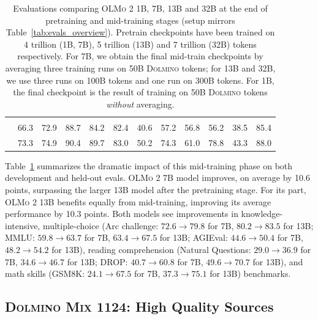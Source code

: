 \documentclass[table]{ai2style/ai2}
\newcommand{\olmotoo}{\textsc{OLMo 2}\xspace}
\newcommand{\dolminos}{\textsc{Dolmino Mix 1124}\xspace}
\begin{document}
\begin{table}[ht]
\begin{center}
\begin{small}
\begin{tabular}{lc|cccccc|cccc}
\rowcolor{ai2midpink}\multicolumn{12}{c}{\textbf{\olmotoo 32B}} \\
\rowcolor{ai2lightpink}{{Pretraining}} & 66.3 & 72.9 & 88.7 & 84.2 & 82.4 & 40.6 & 57.2 & 56.8 & 56.2 & 38.5 & 85.4 \\
\rowcolor{ai2lightpink}{{Pretraining \& mid-training}\hspace{.5em}} & 73.3 & 74.9 & 90.4 & 89.7 & 83.0 & 50.2 & 74.3 & 61.0 & 78.8 & 43.3 & 88.0 \\
\bottomrule
\end{tabular}
\end{small}
\vspace{2mm}
\caption{
Evaluations comparing \olmotoo 1B, 7B, 13B and 32B at the end of pretraining and mid-training stages (setup mirrors Table~\ref{tab:evals_overview}). 
Pretrain checkpoints have been trained on 4 trillion (1B, 7B), 5 trillion (13B) and 7 trillion (32B) tokens respectively. 
For 7B, we obtain the final mid-train checkpoints by averaging three training runs on 50B \textsc{Dolmino} tokens;
for 13B and 32B, we use three runs on 100B tokens and one run on 300B tokens.
For 1B, the final checkpoint is the result of training on 50B \textsc{Dolmino} tokens \textit{without} averaging.}
\label{tab:evals-pre-post-anneal}
\end{center}
\end{table}

Table~\ref{tab:evals-pre-post-anneal} summarizes the dramatic impact of this mid-training phase on both development and held-out evals. 
\olmotoo 7B model improves, on average by 10.6 points, surpassing the larger 13B model after the pretraining stage.
For its part, \olmotoo 13B benefits equally from mid-training, improving its average performance by 10.3 points.
Both models see improvements in knowledge-intensive, multiple-choice  (Arc challenge: $72.6\rightarrow79.8$ for 7B, $80.2\rightarrow83.5$ for 13B; MMLU: $59.8\rightarrow63.7$ for 7B, $63.4\rightarrow67.5$ for 13B; AGIEval: $44.6\rightarrow50.4$ for 7B, $48.2\rightarrow54.2$ for 13B), reading comprehension (Natural Questions: $29.0\rightarrow36.9$ for 7B, $34.6\rightarrow46.7$ for 13B; DROP: $40.7\rightarrow60.8$ for 7B, $49.6\rightarrow70.7$ for 13B), and math skills (GSM8K: $24.1\rightarrow67.5$ for 7B, $37.3\rightarrow75.1$ for 13B) benchmarks. 

\subsection{\dolminos: High Quality Sources}
\label{sec:annealing_general_mix}
\end{document}
